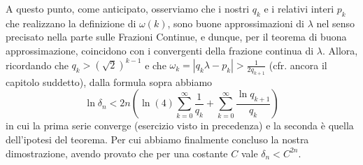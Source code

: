 A questo punto, come anticipato, osserviamo che i nostri $q_k$ e i relativi interi $p_k$ che realizzano la definizione di $\omega(k)$, 
sono buone approssimazioni di $\lambda$ nel senso precisato nella parte sulle Frazioni Continue, e dunque, per il teorema di buona approssimazione,
coincidono con i convergenti della frazione continua di $\lambda$. 
Allora, ricordando che $q_k>(\sqrt{2})^{k-1}$ e che $\omega_k=|q_k\lambda-p_k|>\frac{1}{2q_{k+1}}$ (cfr. ancora il capitolo suddetto), dalla formula sopra abbiamo
\[\ln\delta_n <2n\left(\ln(4)\sum_{k=0}^\infty \frac{1}{q_k}+\sum_{k=0}^\infty \frac{\ln q_{k+1}}{q_k} \right)\]
in cui la prima serie converge (esercizio visto in precedenza) e la seconda è quella dell'ipotesi del teorema. 
Per cui abbiamo finalmente concluso la nostra dimostrazione, avendo provato che per una costante $C$ vale $\delta_n<C^{2n}$.